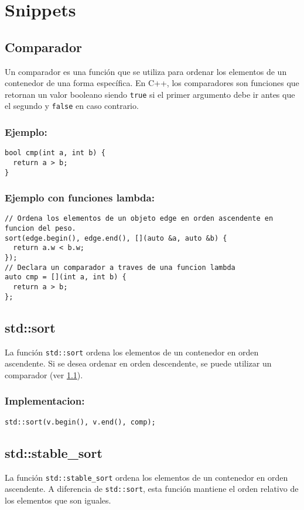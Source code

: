 \section{Snippets}

\subsection{Comparador}
\label{subsec:comparador}
Un comparador es una función que se utiliza para ordenar los elementos de un contenedor de una forma específica. En C++, los comparadores son funciones que retornan un valor booleano siendo \texttt{true} si el primer argumento debe ir antes que el segundo y \texttt{false} en caso contrario.

\subsubsection*{Ejemplo:}
\begin{lstlisting}
bool cmp(int a, int b) {
  return a > b;
}
\end{lstlisting}
\subsubsection*{Ejemplo con funciones lambda:}
\begin{lstlisting}
// Ordena los elementos de un objeto edge en orden ascendente en funcion del peso.
sort(edge.begin(), edge.end(), [](auto &a, auto &b) {
  return a.w < b.w;
});
// Declara un comparador a traves de una funcion lambda
auto cmp = [](int a, int b) {
  return a > b;
};
\end{lstlisting}

\subsection{std::sort}
\label{subsec:std_sort}
La función \texttt{std::sort} ordena los elementos de un contenedor en orden ascendente. Si se desea ordenar en orden descendente, se puede utilizar un comparador (ver \ref{subsec:comparador}).

\subsubsection*{Implementacion:}
\begin{lstlisting}
std::sort(v.begin(), v.end(), comp);
\end{lstlisting}

\subsection{std::stable\_sort}
\label{subsec:std_stable_sort}
La función \texttt{std::stable\_sort} ordena los elementos de un contenedor en orden ascendente. A diferencia de \texttt{std::sort}, esta función mantiene el orden relativo de los elementos que son iguales.

